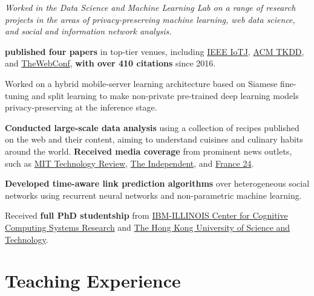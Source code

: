 \documentclass[11pt]{article}
\begin{document}
\begin{outerlist}
{\textit{Worked in the {Data Science and Machine Learning Lab} on a range of research projects in the areas of privacy-preserving machine learning, web data science, and social and information network analysis.}
  \begin{innerlist}
    \item \textbf{published four papers} in top-tier venues, including \href{https://ieee-iotj.org/}{IEEE IoTJ}, \href{https://dl.acm.org/journal/tkdd}{ACM TKDD}, and \href{https://thewebconf.org/www2017/}{TheWebConf}, \textbf{with over 410 citations} since 2016.
    \item Worked on a hybrid mobile-server learning architecture based on Siamese fine-tuning and split learning to make non-private pre-trained deep learning models privacy-preserving at the inference stage.
    \item \textbf{Conducted large-scale data analysis} using a collection of recipes published on the web and their content, aiming to understand cuisines and culinary habits around the world. \textbf{Received media coverage} from prominent news outlets, such as \href{https://www.technologyreview.com/s/602790/how-data-mining-reveals-the-worlds-healthiest-cuisines/}{MIT Technology Review}, \href{https://www.indy100.com/article/healthy-diverse-top-healthiest-countries-cuisine-food-in-the-world-list-7412171}{The Independent}, and \href{https://www.france24.com/fr/20161115-algorithme-compare-cuisines-monde-matiere-dingredients-dapports-nutritionnels}{France 24}.
    \item \textbf{Developed time-aware link prediction algorithms} over heterogeneous social networks using recurrent neural networks and non-parametric machine learning.
    \item Received \textbf{full PhD studentship} from
    \href{https://www.c3sr.com/}{IBM-ILLINOIS Center for Cognitive Computing Systems Research} and \href{https://hkust.edu.hk/}{The Hong Kong University of Science and Technology}.
  \end{innerlist}}

\end{outerlist}

\section{Teaching Experience}
\end{document}
